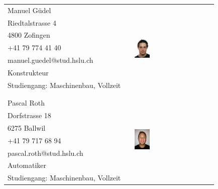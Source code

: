 \begin{tabular}{lp{3.3cm}l}
    Manuel Güdel                                & & 
	\multirow{8}{4cm}{\includegraphics[width=0.2\textwidth]{DasTeam/Bilder/ManuelGuedel.jpg}} \\
    Riedtalstrasse 4                            & &  \\
    4800 Zofingen                               & &  \\
    +41 79 774 41 40                            & &  \\
    manuel.guedel@stud.hslu.ch                  & &  \\
    Konstrukteur                                & &  \\
    Studiengang: Maschinenbau, Vollzeit         & &  \\
                                                & &  \\
    				                            & &  \\
    Pascal Roth 								& & \multirow{8}{4cm}{\includegraphics[width=0.2\textwidth]{DasTeam/Bilder/PascalRoth.jpg}} \\
    Dorfstrasse 18                              & &  \\
    6275 Ballwil                                & &  \\
    +41 79 717 68 94                            & &  \\
    pascal.roth@stud.hslu.ch                    & &  \\
    Automatiker                                 & &  \\
    Studiengang: Maschinenbau, Vollzeit         & &  \\
  \end{tabular}